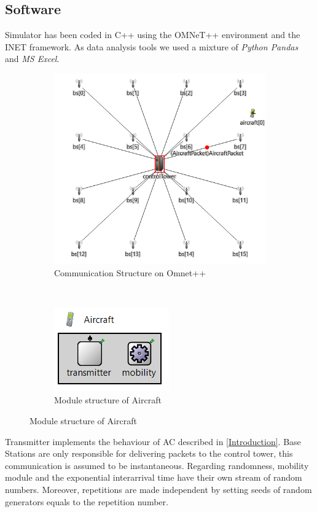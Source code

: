 \documentclass[a4paper,12pt]{article}
\begin{document}
\subsection{Software}
Simulator has been coded in C++ using the OMNeT++ environment and the INET framework. As data analysis tools we used a mixture of \textit{Python Pandas} and \textit{MS Excel}.
\begin{figure}[H]
  \centering
  \begin{subfigure}[b]{0.45\textwidth}
    \centering
    \includegraphics[scale=0.65]{img/Implementation.png}
    \caption{Communication Structure on Omnet++}
    \label{fig:aircraft-ned}
  \end{subfigure}
  ~
  \begin{subfigure}[b]{0.45\textwidth}
      \centering
      \includegraphics{img/aircraft-ned.png}
      \caption{Module structure of Aircraft}
      \label{fig:aircraft-ned}
  \end{subfigure}
\end{figure}
Transmitter implements the behaviour of AC described in \ref{Introduction}. Base Stations are only responsible for delivering packets to the control tower,
this communication is assumed to be instantaneous.
Regarding randomness, mobility module and the exponential interarrival time have their own stream of random numbers.
Moreover, repetitions are made independent by setting seeds of random generators equals to the repetition number.
\end{document}
